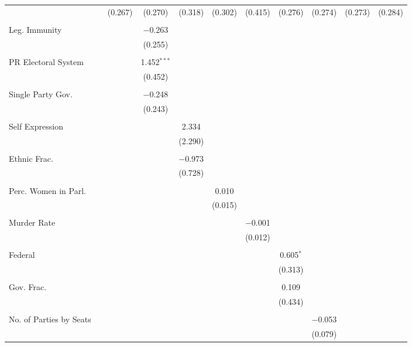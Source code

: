 \documentclass[a4paper]{article}\usepackage[]{graphicx}\usepackage[]{color}
\begin{document}
\begin{table}
\begin{center}
{{\begin{tabular}{@{\extracolsep{5pt}}lcccccccccc}
  &  & (0.267) & (0.270) & (0.318) & (0.302) & (0.415) & (0.276) & (0.274) & (0.273) & (0.284) \\ 
  & & & & & & & & & & \\ 
 Leg. Immunity &  &  & $-$0.263 &  &  &  &  &  &  &  \\ 
  &  &  & (0.255) &  &  &  &  &  &  &  \\ 
  & & & & & & & & & & \\ 
 PR Electoral System &  &  & 1.452$^{***}$ &  &  &  &  &  &  &  \\ 
  &  &  & (0.452) &  &  &  &  &  &  &  \\ 
  & & & & & & & & & & \\ 
 Single Party Gov. &  &  & $-$0.248 &  &  &  &  &  &  &  \\ 
  &  &  & (0.243) &  &  &  &  &  &  &  \\ 
  & & & & & & & & & & \\ 
 Self Expression &  &  &  & 2.334 &  &  &  &  &  &  \\ 
  &  &  &  & (2.290) &  &  &  &  &  &  \\ 
  & & & & & & & & & & \\ 
 Ethnic Frac. &  &  &  & $-$0.973 &  &  &  &  &  &  \\ 
  &  &  &  & (0.728) &  &  &  &  &  &  \\ 
  & & & & & & & & & & \\ 
 Perc. Women in Parl. &  &  &  &  & 0.010 &  &  &  &  &  \\ 
  &  &  &  &  & (0.015) &  &  &  &  &  \\ 
  & & & & & & & & & & \\ 
 Murder Rate &  &  &  &  &  & $-$0.001 &  &  &  &  \\ 
  &  &  &  &  &  & (0.012) &  &  &  &  \\ 
  & & & & & & & & & & \\ 
 Federal &  &  &  &  &  &  & 0.605$^{*}$ &  &  &  \\ 
  &  &  &  &  &  &  & (0.313) &  &  &  \\ 
  & & & & & & & & & & \\ 
 Gov. Frac. &  &  &  &  &  &  & 0.109 &  &  &  \\ 
  &  &  &  &  &  &  & (0.434) &  &  &  \\ 
  & & & & & & & & & & \\ 
 No. of Parties by Seats &  &  &  &  &  &  &  & $-$0.053 &  &  \\ 
  &  &  &  &  &  &  &  & (0.079) &  &  \\ 

\end{tabular}}}
\end{center}
\end{table}
\end{document}
